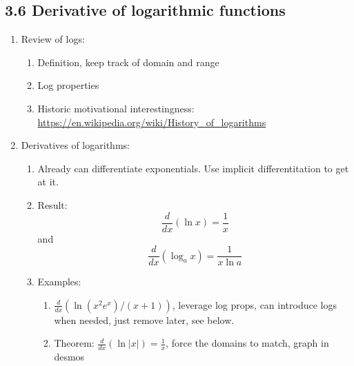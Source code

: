 \documentclass{article}
\begin{document}
\subsection{3.6 Derivative of logarithmic functions}
\begin{enumerate}

\item Review of logs:
\begin{enumerate}
\item Definition, keep track of domain and range
\item Log properties
\item Historic motivational interestingness: \url{https://en.wikipedia.org/wiki/History_of_logarithms}
\end{enumerate}

\item Derivatives of logarithms:
\begin{enumerate}
\item Already can differentiate exponentials. Use implicit differentitation to get at it.
\item Result:
$$
\frac{d}{dx}(\ln x) = \frac{1}{x}
$$
and
$$
\frac{d}{dx}(\log_a x) = \frac{1}{x\ln a}
$$

\item Examples:
\begin{enumerate}
\item $\frac{d}{dx} (\ln (x^2 e^x)/(x+1))$, leverage log props, can introduce logs when needed, just remove later, see below.
\item Theorem: $\frac{d}{dx}(\ln |x|) = \frac{1}{x}$, force the domains to match, graph in desmos
\end{enumerate}
\end{enumerate}


\end{enumerate}
\end{document}
